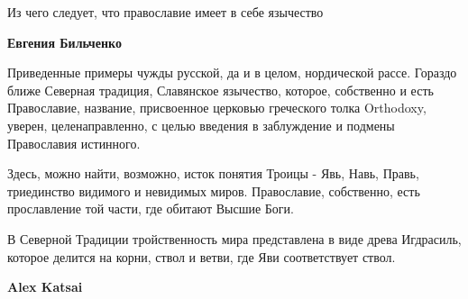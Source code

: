 \begin{itemize}
\begin{itemize}
Из чего следует, что православие имеет в себе язычество

 
\textbf{Евгения Бильченко} 

Приведенные примеры чужды русской, да и в целом, нордической рассе. Гораздо
ближе Северная традиция, Славянское язычество, которое, собственно и есть
Православие, название, присвоенное церковью греческого толка Orthodoxy, уверен,
целенаправленно, с целью введения в заблуждение и подмены Православия
истинного.

Здесь, можно найти, возможно, исток понятия Троицы - Явь, Навь, Правь,
триединство видимого и невидимых миров. Православие, собственно, есть
прославление той части, где обитают Высшие Боги.

В Северной Традиции тройственность мира представлена в виде древа Игдрасиль,
которое делится на корни, ствол и ветви, где Яви соответствует ствол.


 
\textbf{Alex Katsai} 


\end{itemize}
\end{itemize}
